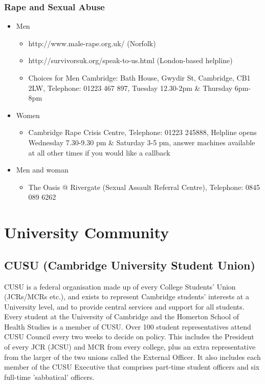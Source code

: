 \documentclass[11pt,fleqn, oneside]{book} %
\begin{document}
\subsection{Rape and Sexual Abuse}
\begin{itemize}
\item Men
\begin{itemize}
\item http://www.male-rape.org.uk/ (Norfolk)
\item http://survivorsuk.org/speak-to-us.html (London-based helpline)
\item Choices for Men Cambridge: Bath House, Gwydir St, Cambridge, CB1 2LW, Telephone: 01223 467 897, Tuesday 12.30-2pm \& Thursday 6pm-8pm
\end{itemize}
\item Women
\begin{itemize}
\item Cambridge Rape Crisis Centre, Telephone: 01223 245888, Helpline opens Wednesday 7.30-9.30 pm \& Saturday 3-5 pm, answer machines available at all other times if you would like a callback
\end{itemize}
\item Men and woman
\begin{itemize}
\item The Oasis @ Rivergate (Sexual Assault Referral Centre), Telephone: 0845 089 6262
\end{itemize}
\end{itemize}



\chapter{University Community}
    
\section{CUSU (Cambridge University Student Union)}
    
CUSU is a federal organisation made up of every College Students' Union (JCRs/MCRs etc.), and exists to represent Cambridge students' interests at a University level, and to provide central services and support for all students. Every student at the University of Cambridge and the Homerton School of Health Studies is a member of CUSU. Over 100 student representatives attend CUSU Council every two weeks to decide on policy. This includes the President of every JCR (JCSU) and MCR from every college, plus an extra representative from the larger of the two unions called the External Officer. It also includes each member of the CUSU Executive that comprises part-time student officers and six full-time 'sabbatical' officers.
    
\end{document}
